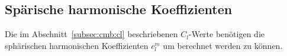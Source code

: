 \subsection{Spärische harmonische Koeffizienten}

Die im Abschnitt~\ref{subsec:cmb:cl} beschriebenen $C_l$-Werte benötigen die 
sphärischen harmonischen Koeffizienten $c_l^m$ um berechnet werden zu können.
